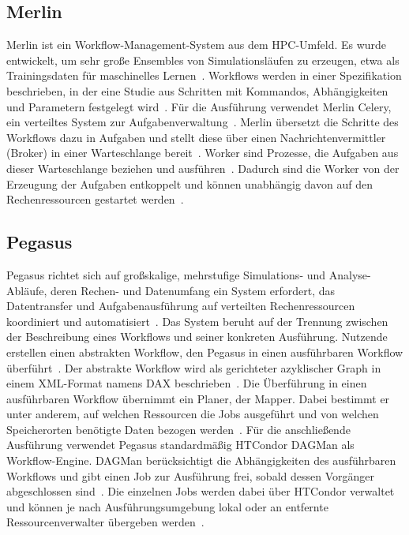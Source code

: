 \subsection{Merlin}
\label{sec:basics:merlin}
Merlin ist ein Workflow-Management-System aus dem HPC-Umfeld. Es wurde
entwickelt, um sehr große Ensembles von Simulationsläufen zu
erzeugen, etwa als Trainingsdaten für maschinelles
Lernen~\cite[S.~255\,f.]{peterson2022merlin}. Workflows werden in
einer Spezifikation beschrieben, in der eine Studie aus Schritten
mit Kommandos, Abhängigkeiten und Parametern festgelegt
wird~\cite[S.~258]{peterson2022merlin}.
Für die Ausführung verwendet Merlin Celery, ein verteiltes System zur
Aufgabenverwaltung~\cite[S.~258]{peterson2022merlin}\cite{merlindocs-configuration}. Merlin übersetzt die Schritte des Workflows dazu in Aufgaben und stellt diese über einen Nachrichtenvermittler (Broker) in einer
Warteschlange bereit~\cite[S.~258]{peterson2022merlin}\cite{merlindocs-configuration}. Worker sind Prozesse, die Aufgaben aus dieser Warteschlange
beziehen und ausführen~\cite[S.~258]{peterson2022merlin}\cite{merlindocs-configuration}. Dadurch sind die Worker von der Erzeugung der Aufgaben entkoppelt und können unabhängig davon auf den Rechenressourcen gestartet
werden~\cite[S.~261]{peterson2022merlin}.


\subsection{Pegasus}
\label{sec:basics:pegasus}
Pegasus richtet sich auf großskalige, mehrstufige Simulations- und
Analyse-Abläufe, deren Rechen- und Datenumfang ein System
erfordert, das Datentransfer und Aufgabenausführung auf verteilten
Rechenressourcen koordiniert und
automatisiert~\cite[S.~17]{deelman2015pegasus}. Das System beruht auf der Trennung zwischen der Beschreibung eines
Workflows und seiner konkreten Ausführung. Nutzende erstellen
einen abstrakten Workflow, den Pegasus in einen ausführbaren
Workflow überführt~\cite[S.~18]{deelman2015pegasus}. Der abstrakte
Workflow wird als gerichteter azyklischer Graph in einem
XML-Format namens DAX beschrieben~\cite[S.~19]{deelman2015pegasus}. Die Überführung in einen ausführbaren Workflow übernimmt ein Planer, der Mapper.
Dabei bestimmt er unter anderem, auf welchen Ressourcen die Jobs
ausgeführt und von welchen Speicherorten benötigte Daten bezogen
werden~\cite[S.~20]{deelman2015pegasus}. Für die anschließende
Ausführung verwendet Pegasus standardmäßig HTCondor DAGMan als
Workflow-Engine. DAGMan berücksichtigt die Abhängigkeiten des
ausführbaren Workflows und gibt einen Job zur Ausführung frei,
sobald dessen Vorgänger abgeschlossen
sind~\cite[S.~20]{deelman2015pegasus}. Die einzelnen Jobs werden
dabei über HTCondor verwaltet und können je nach
Ausführungsumgebung lokal oder an entfernte Ressourcenverwalter
übergeben werden~\cite[S.~20]{deelman2015pegasus}.


